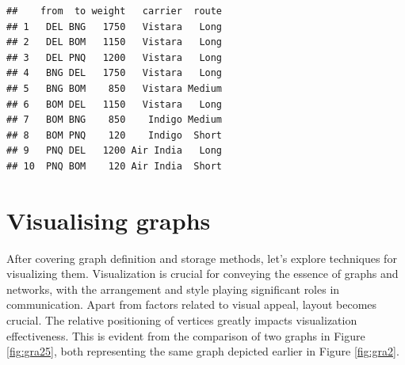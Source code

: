 \documentclass[
]{book}
\newenvironment{Shaded}{\begin{snugshade}}{\end{snugshade}}
\newcommand{\CommentTok}[1]{\textcolor[rgb]{0.56,0.35,0.01}{\textit{#1}}}
\newcommand{\ConstantTok}[1]{\textcolor[rgb]{0.56,0.35,0.01}{#1}}
\newcommand{\DecValTok}[1]{\textcolor[rgb]{0.00,0.00,0.81}{#1}}
\newcommand{\DocumentationTok}[1]{\textcolor[rgb]{0.56,0.35,0.01}{\textbf{\textit{#1}}}}
\newcommand{\FunctionTok}[1]{\textcolor[rgb]{0.13,0.29,0.53}{\textbf{#1}}}
\newcommand{\NormalTok}[1]{#1}
\newcommand{\OtherTok}[1]{\textcolor[rgb]{0.56,0.35,0.01}{#1}}
\newcommand{\SpecialCharTok}[1]{\textcolor[rgb]{0.81,0.36,0.00}{\textbf{#1}}}
\newcommand{\StringTok}[1]{\textcolor[rgb]{0.31,0.60,0.02}{#1}}
\begin{document}
\begin{Shaded}
\end{Shaded}

\begin{verbatim}
##    from  to weight   carrier  route
## 1   DEL BNG   1750   Vistara   Long
## 2   DEL BOM   1150   Vistara   Long
## 3   DEL PNQ   1200   Vistara   Long
## 4   BNG DEL   1750   Vistara   Long
## 5   BNG BOM    850   Vistara Medium
## 6   BOM DEL   1150   Vistara   Long
## 7   BOM BNG    850    Indigo Medium
## 8   BOM PNQ    120    Indigo  Short
## 9   PNQ DEL   1200 Air India   Long
## 10  PNQ BOM    120 Air India  Short
\end{verbatim}

\hypertarget{visualising-graphs}{%
\section{Visualising graphs}\label{visualising-graphs}}

After covering graph definition and storage methods, let's explore techniques for visualizing them. Visualization is crucial for conveying the essence of graphs and networks, with the arrangement and style playing significant roles in communication. Apart from factors related to visual appeal, layout becomes crucial. The relative positioning of vertices greatly impacts visualization effectiveness. This is evident from the comparison of two graphs in Figure \ref{fig:gra25}, both representing the same graph depicted earlier in Figure \ref{fig:gra2}.
\end{document}
